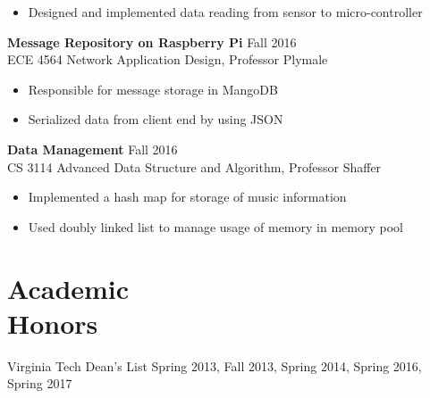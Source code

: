\documentclass[margin]{res}
\begin{document}
\begin{resume}
\begin{itemize}
                 \item  Designed and implemented data reading from sensor to micro-controller

		 \end{itemize}

		{\bf  Message Repository on Raspberry Pi}                                     \hfill       Fall 2016 \\
		{ECE 4564 Network Application Design, Professor Plymale}
                \begin{itemize} \itemsep -2pt
                 \item  Responsible for message storage in MangoDB 
                
                 \item Serialized data from client end by using JSON

		 \end{itemize}

                  {\bf  Data Management}                             \hfill  Fall 2016 \\ 
                  {CS 3114 Advanced Data Structure and Algorithm, Professor Shaffer}  
                  \begin{itemize} \itemsep -2pt
                  \item Implemented a hash map for storage of music information
                  \item Used doubly linked list to manage usage of memory in memory pool
		 \end{itemize}

\section{Academic \\ Honors} 
Virginia Tech Dean's List Spring 2013, Fall 2013, Spring 2014, Spring 2016, Spring 2017
 

\end{resume} 
\end{document}
